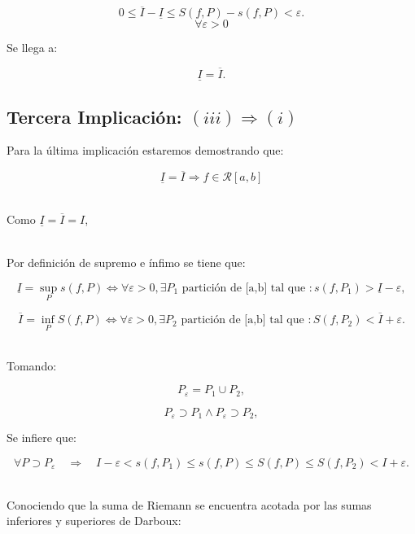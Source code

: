 \documentclass[a4paper,12pt]{article}
\begin{document}
	\[
	0 \leq \overline{I} - \underline{I} \leq S(f, P) - s(f, P) < \varepsilon.
	\] \[\forall \varepsilon > 0\]
	
	
	
	Se llega a:
	
	
	
	\[
	\underline{I} = \overline{I}.
	\]
	
	
	
	\subsection{Tercera Implicación: $ (iii) \Rightarrow (i) $ } 
	
	
	Para la última implicación estaremos demostrando que:
	
	\[
	\underline{I} = \overline{I} \Rightarrow f \in \mathcal{R}[a,b]
	\]
	
	\quad \\
	
	Como \( \underline{I} = \overline{I} = I \), 
	
	\quad \\
	
	Por definición de supremo e ínfimo se tiene que:
	
	\[
	\underline{I} = \sup_P s(f, P) \Longleftrightarrow \forall \varepsilon > 0, \exists P_1 \text{ partición de [a,b] tal que } : s(f, P_1) > \underline{I} - \varepsilon,
	\]
	
	\[
	\overline{I} = \inf_P S(f, P) \Longleftrightarrow \forall \varepsilon > 0, \exists P_2\text{ partición de [a,b] tal que } : S(f, P_2) < \overline{I} + \varepsilon.
	\]
	
	\quad \\
	
	Tomando:
	
	
	
	\[
	P_\varepsilon = P_1 \cup P_2,
	\]
	
	
	
	
	
	\[
	P_\varepsilon \supset P_1 \land P_\varepsilon \supset P_2,
	\]
	
	
	
	Se infiere que:
	
	
	
	\[
	\forall P \supset P_\varepsilon \quad \Rightarrow \quad I - \varepsilon < s(f, P_1) \leq s(f, P) \leq S(f,P) \leq S(f, P_2) < I + \varepsilon.
	\]
	
	\quad \\
	
	Conociendo que la suma de Riemann se encuentra acotada por las sumas inferiores y superiores de Darboux:
	
\end{document}
